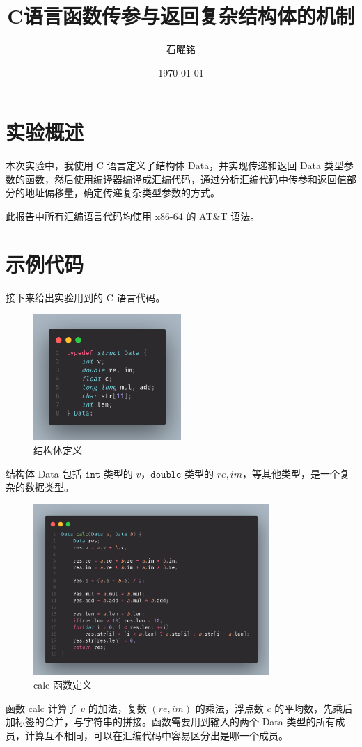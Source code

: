 \documentclass{article}
\title{C语言函数传参与返回复杂结构体的机制}
\author{石曜铭}
\date{\today}
\begin{document}
\maketitle

\section{实验概述}

本次实验中，我使用 C 语言定义了结构体 Data，并实现传递和返回 Data 类型参数的函数，然后使用编译器编译成汇编代码，通过分析汇编代码中传参和返回值部分的地址偏移量，确定传递复杂类型参数的方式。

此报告中所有汇编语言代码均使用 x86-64 的 AT\&T 语法。

\section{示例代码}
接下来给出实验用到的 C 语言代码。
\begin{figure}[htbp]
    \centering
    \includegraphics[width=0.5\textwidth]{pics/struct.png}
    \caption{结构体定义}
\end{figure}

结构体 Data 包括 $\texttt{int}$ 类型的 $v$，$\texttt{double}$ 类型的 $re, im$，等其他类型，是一个复杂的数据类型。
\newpage
\begin{figure}[htbp]
    \centering
    \includegraphics[width=0.8\textwidth]{pics/calc.png}
    \caption{calc 函数定义}
\end{figure}
函数 calc 计算了 $v$ 的加法，复数 $(re,im)$ 的乘法，浮点数 $c$ 的平均数，先乘后加标签的合并，与字符串的拼接。函数需要用到输入的两个 Data 类型的所有成员，计算互不相同，可以在汇编代码中容易区分出是哪一个成员。
\end{document}
